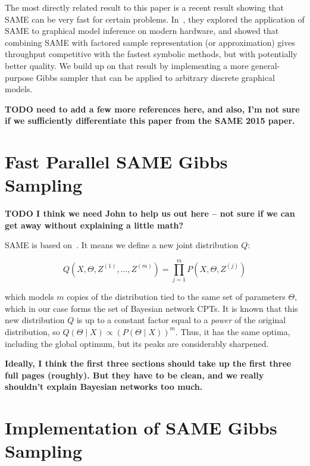 \documentclass{article} %
\begin{document}
The most directly related result to this paper is a recent result showing that SAME can be very fast
for certain problems. In~\citep{SAME2015}, they explored the application of SAME to graphical model
inference on modern hardware, and showed that combining SAME with factored sample representation
(or approximation) gives throughput competitive with the fastest symbolic methods, but with
potentially better quality. We build up on that result by implementing a more general-purpose Gibbs
sampler that can be applied to arbitrary discrete graphical models.

\textbf{TODO need to add a few more references here, and also, I'm not sure if we sufficiently
differentiate this paper from the SAME 2015 paper.}




\section{Fast Parallel SAME Gibbs Sampling}\label{sec:same}

\textbf{TODO I think we need John to help us out here -- not sure if we can get away without
explaining a little math?}

SAME is based on~\citep{SAME2002}. It means we define a new joint distribution $Q$:

\begin{equation}\label{eq:same}
Q(X,\Theta,Z^{(1)},\ldots,Z^{(m)}) = \prod_{j=1}^m P(X,\Theta,Z^{(j)})
\end{equation}

which models $m$ copies of the distribution tied to the same set of parameters $\Theta$, which in
our case forms the set of Bayesian network CPTs. It is known that this new distribution $Q$ is up to
a constant factor equal to a \emph{power} of the original distribution, so $Q(\Theta \mid X) \propto
(P(\Theta \mid X))^m$. Thus, it has the same optima, including the global optimum, but its peaks are
considerably sharpened.

\textbf{Ideally, I think the first three sections should take up the first three full pages
(roughly). But they have to be clean, and we really shouldn't explain Bayesian networks too much.}




\section{Implementation of SAME Gibbs Sampling}\label{sec:implementation}
\end{document}
